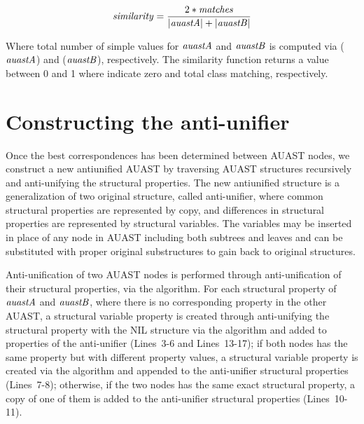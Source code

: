 \begin{equation}\label{eq1}
\mathit{similarity} = \frac{2*\mathit{matches}}{|\mathit{auastA}| + |\mathit{auastB}|}
\end{equation}

Where total number of simple values for $\mathit{auastA}$ and $\mathit{auastB}$ is computed via ($\mathit{auastA}$) and ($\mathit{auastB}$), respectively. The similarity function returns a value between 0 and 1 where indicate zero and total class matching, respectively.


\section{Constructing the anti-unifier} \label{meth-antiUnifier}
Once the best correspondences has been determined between AUAST nodes, we construct a new antiunified AUAST by traversing AUAST structures recursively and anti-unifying the structural properties. The new antiunified structure is a generalization of two original structure, called anti-unifier, where common structural properties are represented by copy, and differences in structural properties are represented by structural variables. The variables may be inserted in place of any node in AUAST including both subtrees and leaves and can be substituted with proper original substructures to gain back to original structures.

Anti-unification of two AUAST nodes is performed through anti-unification of their structural properties, via the  algorithm. For each structural property of $\mathit{auastA}$ and $\mathit{auastB}$, where there is no corresponding property in the other AUAST, a structural variable property is created through anti-unifying the structural property with the NIL structure via the  algorithm and added to properties of the anti-unifier (Lines~3-6 and Lines~13-17); if both nodes has the same property but with different property values, a structural variable property is created via the  algorithm and appended to the anti-unifier structural properties (Lines~7-8); otherwise, if the two nodes has the same exact structural property, a copy of one of them is added to the anti-unifier structural properties (Lines~10-11).


